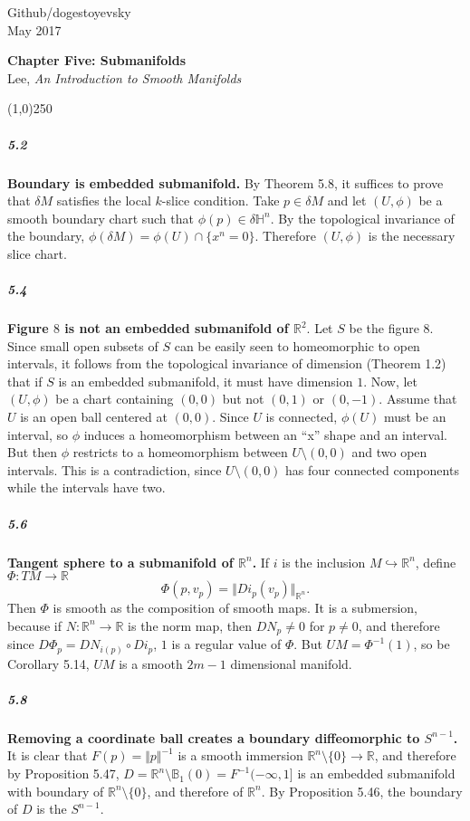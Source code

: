\documentclass[10pt,letter]{article}
\begin{document}
\noindent Github/dogestoyevsky \\
May 2017
\begin{center}
\textbf{Chapter Five: Submanifolds}\\ Lee, \textit{An Introduction to Smooth Manifolds}

\line(1,0){250}
\end{center}

\subparagraph{5.2} {\bf Boundary is embedded submanifold.} By Theorem 5.8, it suffices to prove that $\delta M$ satisfies the local $k$-slice condition. Take $p \in \delta M$ and let $(U,\phi)$ be a smooth boundary chart such that $\phi(p) \in \delta \mathbb{H}^n$. By the topological invariance of the boundary, $\phi(\delta M) = \phi(U) \cap \lbrace x^n = 0 \rbrace$. Therefore $(U,\phi)$ is the necessary slice chart.

\subparagraph{5.4} {\bf Figure $8$ is not an embedded submanifold of $\mathbb{R}^2$}. Let $S$ be the figure $8$.  Since small open subsets of $S$ can be easily seen to homeomorphic to open intervals, it follows from the topological invariance of dimension (Theorem 1.2) that if $S$ is an embedded submanifold, it must have dimension $1$. Now, let $(U,\phi)$ be a chart containing $(0,0)$ but not $(0,1)$ or $(0,-1)$. Assume that $U$ is an open ball centered at $(0,0)$. Since $U$ is connected, $\phi(U)$ must be an interval, so $\phi$ induces a homeomorphism between an ``x'' shape and an interval. But then $\phi$ restricts to a homeomorphism between $U \setminus (0,0)$ and two open intervals. This is a contradiction, since $U \setminus (0,0)$ has four connected components while the intervals have two. 

\subparagraph{5.6} {\bf Tangent sphere to a submanifold of $\mathbb{R}^n$.} If $i$ is the inclusion $M \hookrightarrow \mathbb{R}^n$, define $\Phi: TM \rightarrow \mathbb{R}$
\[
\Phi(p,v_p) = \Vert Di_p(v_p) \Vert_{\mathbb{R}^n}.
\]
Then $\Phi$ is smooth as the composition of smooth maps. It is a submersion, because if $N: \mathbb{R}^n \rightarrow \mathbb{R}$ is the norm map, then $DN_p \neq 0$ for $p \neq 0$, and therefore since $D\Phi_p = DN_{i(p)} \circ Di_p$, $1$ is a regular value of $\Phi$. But $UM = \Phi^{-1}(1)$, so be Corollary 5.14, $UM$ is a smooth $2m-1$ dimensional manifold. 

\subparagraph{5.8} {\bf Removing a coordinate ball creates a boundary diffeomorphic to $S^{n-1}$.} It is clear that $F(p) = \Vert p \Vert^{-1}$ is a smooth immersion $\mathbb{R}^n \setminus \lbrace 0 \rbrace \rightarrow \mathbb{R}$, and therefore by Proposition 5.47, $D = \mathbb{R}^n \setminus \mathbb{B}_1(0) = F^{-1}(-\infty,1]$ is an embedded submanifold with boundary of $\mathbb{R}^n \setminus \lbrace 0 \rbrace$, and therefore of $\mathbb{R}^n$. By Proposition 5.46, the boundary of $D$ is the $S^{n-1}$. 
\end{document}
